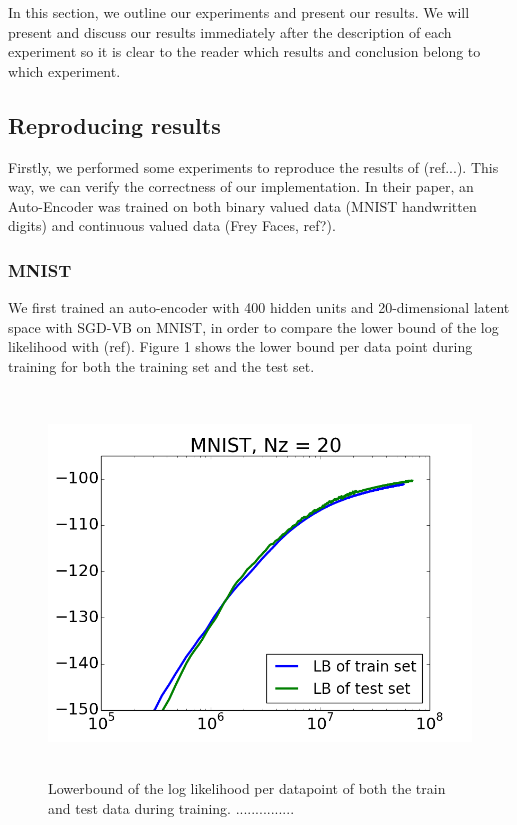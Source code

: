 \documentclass{article}
\begin{document}
In this section, we outline our experiments and present our results. We will present and discuss our results immediately after the description of each experiment so it is clear to the reader which results and conclusion belong to which experiment.

\subsection{Reproducing results}

Firstly, we performed some experiments to reproduce the results of (ref...). This way, we can verify the correctness of our implementation. In their paper, an Auto-Encoder was trained on both binary valued data (MNIST handwritten digits) and continuous valued data (Frey Faces, ref?).

\subsubsection{MNIST}

We first trained an auto-encoder with 400 hidden units and 20-dimensional latent space with SGD-VB on MNIST, in order to compare the lower bound of the log likelihood with (ref). Figure 1 shows the lower bound per data point during training for both the training set and the test set.  \\ 

\begin{figure}[htb]
\begin{center}
\includegraphics[height=4in,width=5in]{lowerboundAEVBMNIST.png}
\caption{Lowerbound of the log likelihood per datapoint of both the train and test data during training. ...............}
\end{center}
\end{figure}
\end{document}
